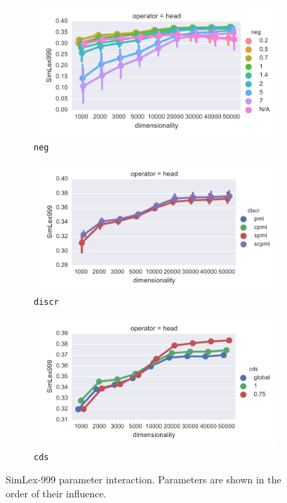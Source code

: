 \begin{figure}
  \begin{subfigure}[t]{0.49\textwidth}
    \includegraphics[width=\textwidth]{supplement/figures/SimLex999-interaction-neg}
    \caption{\texttt{neg}}
    \label{fig:SimLex999-interaction-neg}
  \end{subfigure}
  \begin{subfigure}[t]{0.49\textwidth}
    \includegraphics[width=\textwidth]{supplement/figures/SimLex999-interaction-discr}
    \caption{\texttt{discr}}
    \label{fig:SimLex999-interaction-discr}
  \end{subfigure}

  \begin{subfigure}[t]{0.49\textwidth}
    \includegraphics[width=\textwidth]{supplement/figures/SimLex999-interaction-cds}
    \caption{\texttt{cds}}
    \label{fig:SimLex999-interaction-cds}
  \end{subfigure}

  \caption{SimLex-999 parameter interaction. Parameters are shown in the order of their influence.}
  \label{fig:SimLex999-interaction}
\end{figure}

